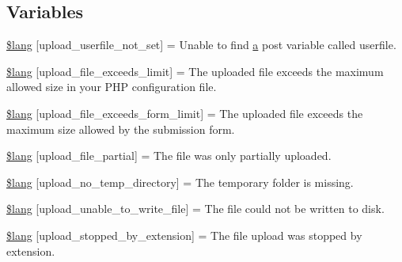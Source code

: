 \subsection*{Variables}
\begin{DoxyCompactItemize}
\item 
\hyperlink{system_2language_2english_2upload__lang_8php_a6d12ff4074b1e4c6f22a4a5107fae5ee}{\$lang} \mbox{[}\textquotesingle{}upload\+\_\+userfile\+\_\+not\+\_\+set\textquotesingle{}\mbox{]} = \textquotesingle{}Unable to find \hyperlink{_admin_2assets_2js_2bootstrap_8min_8js_a1f5870dcf487187f13d5fd328ed9e6e7}{a} post variable called userfile.\textquotesingle{}
\item 
\hyperlink{system_2language_2english_2upload__lang_8php_a9028f049ebbe292a27e0e2b2e5f7d660}{\$lang} \mbox{[}\textquotesingle{}upload\+\_\+file\+\_\+exceeds\+\_\+limit\textquotesingle{}\mbox{]} = \textquotesingle{}The uploaded file exceeds the maximum allowed size in your P\+H\+P configuration file.\textquotesingle{}
\item 
\hyperlink{system_2language_2english_2upload__lang_8php_af6f65d563af150d50dfc6957079fd529}{\$lang} \mbox{[}\textquotesingle{}upload\+\_\+file\+\_\+exceeds\+\_\+form\+\_\+limit\textquotesingle{}\mbox{]} = \textquotesingle{}The uploaded file exceeds the maximum size allowed by the submission form.\textquotesingle{}
\item 
\hyperlink{system_2language_2english_2upload__lang_8php_a79751b02ce35007a90bd9052f83deed9}{\$lang} \mbox{[}\textquotesingle{}upload\+\_\+file\+\_\+partial\textquotesingle{}\mbox{]} = \textquotesingle{}The file was only partially uploaded.\textquotesingle{}
\item 
\hyperlink{system_2language_2english_2upload__lang_8php_ac7144f4992346816875bac28488ef715}{\$lang} \mbox{[}\textquotesingle{}upload\+\_\+no\+\_\+temp\+\_\+directory\textquotesingle{}\mbox{]} = \textquotesingle{}The temporary folder is missing.\textquotesingle{}
\item 
\hyperlink{system_2language_2english_2upload__lang_8php_a620b622468d4e7781fed6316440c85e7}{\$lang} \mbox{[}\textquotesingle{}upload\+\_\+unable\+\_\+to\+\_\+write\+\_\+file\textquotesingle{}\mbox{]} = \textquotesingle{}The file could not be written to disk.\textquotesingle{}
\item 
\hyperlink{system_2language_2english_2upload__lang_8php_ae97257deea3dddb33be4bbc6510a464b}{\$lang} \mbox{[}\textquotesingle{}upload\+\_\+stopped\+\_\+by\+\_\+extension\textquotesingle{}\mbox{]} = \textquotesingle{}The file upload was stopped by extension.\textquotesingle{}

\end{DoxyCompactItemize}
